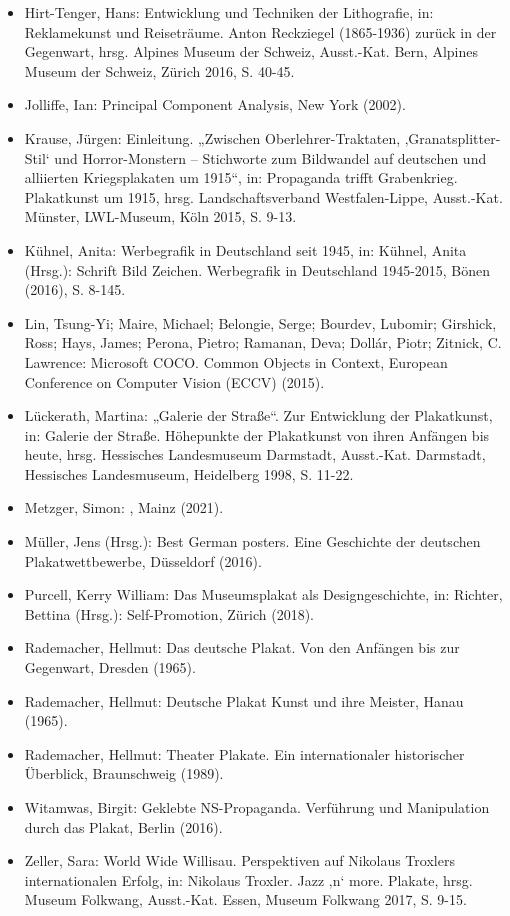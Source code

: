 \documentclass[a4paper,12pt,ngerman]{article}
\begin{document}
\begin{itemize}
\item Hirt-Tenger, Hans: Entwicklung und Techniken der Lithografie, in: Reklamekunst und Reiseträume. Anton Reckziegel (1865-1936) zurück in der Gegenwart, hrsg. Alpines Museum der Schweiz, Ausst.-Kat. Bern, Alpines Museum der Schweiz, Zürich 2016, S. 40-45.
\item Jolliffe, Ian: Principal Component Analysis, New York (2002).
\item Krause, Jürgen: Einleitung. „Zwischen Oberlehrer-Traktaten, ‚Granatsplitter-Stil‘ und Horror-Monstern – Stichworte zum Bildwandel auf deutschen und alliierten Kriegsplakaten um 1915“, in: Propaganda trifft Grabenkrieg. Plakatkunst um 1915, hrsg. Landschaftsverband Westfalen-Lippe, Ausst.-Kat. Münster, LWL-Museum, Köln 2015, S. 9-13.
\item Kühnel, Anita: Werbegrafik in Deutschland seit 1945, in: Kühnel, Anita (Hrsg.): Schrift Bild Zeichen. Werbegrafik in Deutschland 1945-2015, Bönen (2016), S. 8-145.
\item Lin, Tsung-Yi; Maire, Michael; Belongie, Serge; Bourdev, Lubomir; Girshick, Ross; Hays, James; Perona, Pietro; Ramanan, Deva; Dollár, Piotr; Zitnick, C. Lawrence: Microsoft COCO. Common Objects in Context, European Conference on Computer Vision (ECCV) (2015).
\item Lückerath, Martina: „Galerie der Straße“. Zur Entwicklung der Plakatkunst, in: Galerie der Straße. Höhepunkte der Plakatkunst von ihren Anfängen bis heute, hrsg. Hessisches Landesmuseum Darmstadt, Ausst.-Kat. Darmstadt, Hessisches Landesmuseum, Heidelberg 1998, S. 11-22.
\item Metzger, Simon: , Mainz (2021).
\item Müller, Jens (Hrsg.): Best German posters. Eine Geschichte der deutschen Plakatwettbewerbe, Düsseldorf (2016).
\item Purcell, Kerry William: Das Museumsplakat als Designgeschichte, in: Richter, Bettina (Hrsg.): Self-Promotion, Zürich (2018).
\item Rademacher, Hellmut: Das deutsche Plakat. Von den Anfängen bis zur Gegenwart, Dresden (1965).
\item Rademacher, Hellmut: Deutsche Plakat Kunst und ihre Meister, Hanau (1965).
\item Rademacher, Hellmut: Theater Plakate. Ein internationaler historischer Überblick, Braunschweig (1989).
\item Witamwas, Birgit: Geklebte NS-Propaganda. Verführung und Manipulation durch das Plakat, Berlin (2016).
\item Zeller, Sara: World Wide Willisau. Perspektiven auf Nikolaus Troxlers internationalen Erfolg, in: Nikolaus Troxler. Jazz ‚n‘ more. Plakate, hrsg. Museum Folkwang, Ausst.-Kat. Essen, Museum Folkwang 2017, S. 9-15.

\end{itemize}

\end{document}
